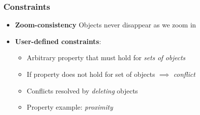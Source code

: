 \documentclass{beamer}
\begin{document}
\frame
{
  \frametitle{Constraints}

  \begin{itemize}
  \item \textbf{Zoom-consistency} Objects never disappear as we zoom in~\cite{fusiontables}
  \item \textbf{User-defined constraints}:
  \begin{itemize}
  \item Arbitrary property that must hold for \emph{sets of objects}
  \item If property does not hold for set of objects $\implies$ \emph{conflict}
  \item Conflicts resolved by \emph{deleting} objects
  \item Property example: \emph{proximity}
  \end{itemize}
  \end{itemize}
  
}
\end{document}

